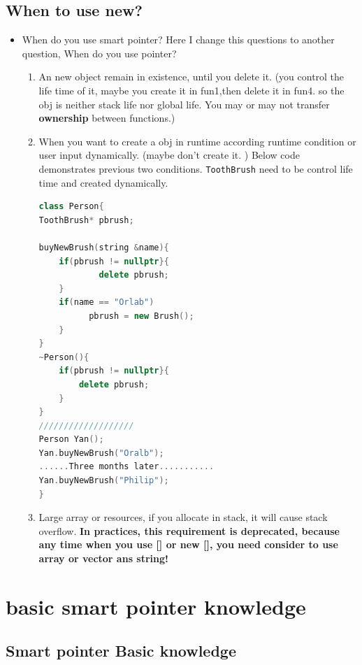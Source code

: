 \documentclass[a4paper,11pt,twoside]{book}
\begin{document}
\subsection{When to use new?}
\begin{itemize}

\item When do you use smart pointer? Here I change this questions to another question, When do you use pointer?
\begin{enumerate}

\item An new object remain in existence, until you delete it. (you control the life time of it, maybe you create it in fun1,then delete it in fun4. so the obj is neither stack life nor global life. You may or may not transfer \textbf{ownership} between functions.)

\item When you want to create a obj in runtime according runtime condition or user input dynamically. (maybe don't create it. ) Below code demonstrates previous two conditions.  \texttt{ToothBrush} need to be control life time and created dynamically.

\begin{lstlisting}[frame=single, language=c++]
class Person{
ToothBrush* pbrush;

buyNewBrush(string &name){
    if(pbrush != nullptr}{
	    	delete pbrush;
    }
    if(name == "Orlab")
          pbrush = new Brush();
    }
}
~Person(){
	if(pbrush != nullptr}{
		delete pbrush;
    }
}
///////////////////
Person Yan();
Yan.buyNewBrush("Oralb");
......Three months later...........
Yan.buyNewBrush("Philip");
}
\end{lstlisting}

\item Large array or resources,  if you allocate in stack, it will cause stack overflow. \textbf{In practices, this requirement is deprecated, because any time when you use [] or new [], you need consider to use array or vector ans string!}
\end{enumerate}

\end{itemize}

\section{basic smart pointer knowledge}

\subsection{Smart pointer Basic knowledge}
\end{document}
